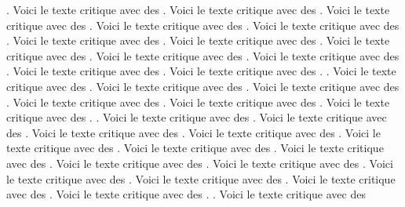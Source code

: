 \documentclass[openany]{book}
\begin{document}
\begin{pages}
\begin{Rightside}
    . Voici le texte critique avec des
    . Voici le texte critique avec des
    . Voici le texte critique avec des
    . Voici le texte critique avec des
    . Voici le texte critique avec des
    . 
    \pend
    \pstart
    Voici le texte critique avec des
    . Voici le texte critique avec des
    . Voici le texte critique avec des
    . Voici le texte critique avec des
    . Voici le texte critique avec des
    . Voici le texte critique avec des
    . Voici le texte critique avec des
    . 
    . Voici le texte critique avec des
    . Voici le texte critique avec des
    . Voici le texte critique avec des
    . Voici le texte critique avec des
    . Voici le texte critique avec des
    . Voici le texte critique avec des
    . 
    . Voici le texte critique avec des
    . Voici le texte critique avec des
    . Voici le texte critique avec des
    . Voici le texte critique avec des
    . Voici le texte critique avec des
    . Voici le texte critique avec des
    . 
    \pend
    \pstart
    Voici le texte critique avec des
    . Voici le texte critique avec des
    . Voici le texte critique avec des
    . Voici le texte critique avec des
    . Voici le texte critique avec des
    . Voici le texte critique avec des
    . Voici le texte critique avec des
    . 
    . Voici le texte critique avec des

\end{Rightside}
\end{pages}
\end{document}
